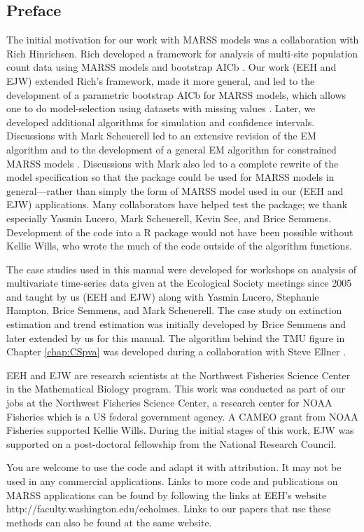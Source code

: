 \subsection*{Preface}

The initial motivation for our work with MARSS models was a collaboration with Rich Hinrichsen. Rich developed a framework for analysis of multi-site population count data using MARSS models and bootstrap AICb \citep{HinrichsenHolmes2009}. Our work (EEH and EJW) extended Rich's framework, made it more general, and led to the development of a parametric bootstrap AICb for MARSS models, which allows one to do model-selection using datasets with missing values \citep{Wardetal2009c, HolmesWard2010}.  Later, we developed additional algorithms for simulation and confidence intervals.  Discussions with Mark Scheuerell led to an extensive revision of the EM algorithm and to the development of a general EM algorithm for constrained MARSS models \citep{Holmes2010}.  Discussions with Mark also led to a complete rewrite of the model specification so that the package could be used for MARSS models in general---rather than simply the form of MARSS model used in our (EEH and EJW) applications.  Many collaborators have helped test the package; we thank especially Yasmin Lucero, Mark Scheuerell, Kevin See, and Brice Semmens.  Development of the code into a R package would not have been possible without Kellie Wills, who wrote the much of the code outside of the algorithm functions.

The case studies used in this manual were developed for workshops on analysis of multivariate time-series data given at the Ecological Society meetings since 2005 and taught by us (EEH and EJW) along with Yasmin Lucero, Stephanie Hampton, Brice Semmens, and Mark Scheuerell.  The case study on extinction estimation and trend estimation was initially developed by Brice Semmens and later extended by us for this manual. The algorithm behind the TMU figure in Chapter \ref{chap:CSpva} was developed during a collaboration with Steve Ellner \citep{EllnerHolmes2008}.
 
EEH and EJW are research scientists at the Northwest Fisheries Science Center in the Mathematical Biology program.  This work was conducted as part of our jobs at the Northwest Fisheries Science Center, a research center for NOAA Fisheries which is a US federal government agency.   A CAMEO grant from NOAA Fisheries supported Kellie Wills.  During the initial stages of this work, EJW was supported on a post-doctoral fellowship from the National Research Council.

You are welcome to use the code and adapt it with attribution.  It may not be used in any commercial applications.  
Links to more code and publications on MARSS applications can be found by following the links at EEH's website http://faculty.washington.edu/eeholmes.   Links to our papers that use these methods can also be found at the same website.